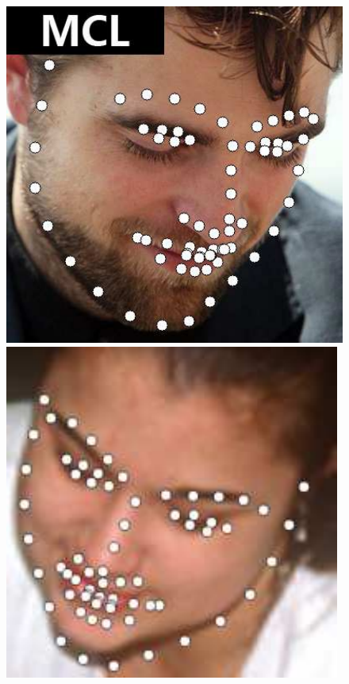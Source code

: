 \documentclass[journal]{IEEEtran}
\begin{document}
\begin{figure}[!htb]
\centering
\includegraphics[scale=0.11]{68_MCNet_image_046}
\includegraphics[scale=0.22]{68_MCNet_image_081}

\end{figure}
\end{document}
